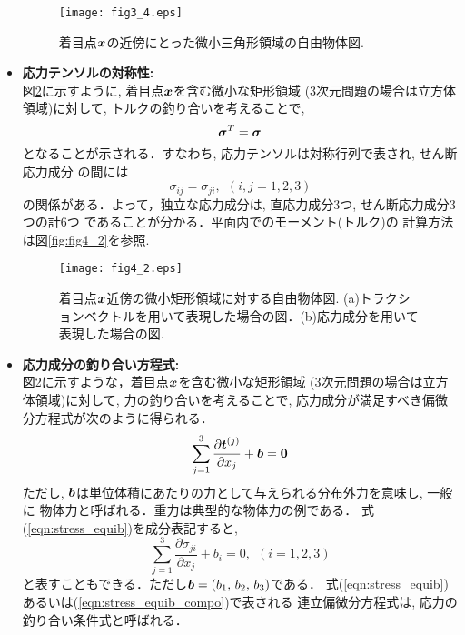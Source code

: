 \documentclass[10pt,a4j]{jbook}
\begin{document}
\begin{itemize}
\begin{figure}[h]
		\begin{center}
		\texttt{[image: fig3\_4.eps]} 
		\end{center}
		\caption{着目点$\mbox{\boldmath $x$}$の近傍にとった微小三角形領域の自由物体図.}
		\label{fig:fig3_4}
									\end{figure}
\item
	{\bf 応力テンソルの対称性:}\\
	図\ref{fig:fig4_1}に示すように, 着目点$\mbox{\boldmath $x$}$を含む微小な矩形領域
	(3次元問題の場合は立方体領域)に対して, トルクの釣り合いを考えることで, 
	\begin{equation}
		\mbox{\boldmath $\sigma$}^{T}=\mbox{\boldmath $\sigma$}
		\label{eqn:sig_sym}
	\end{equation}
	となることが示される．すなわち, 応力テンソルは対称行列で表され, せん断応力成分
	の間には
	\begin{equation}
		\sigma_{ij}=\sigma_{ji}, \ \ (i,j=1,2,3)
		\label{eqn:sig_sym_comp}
	\end{equation}
	の関係がある．よって，独立な応力成分は, 直応力成分3つ, せん断応力成分3つの計6つ
	であることが分かる．平面内でのモーメント(トルク)の
	計算方法は図\ref{fig:fig4_2}を参照.
\begin{figure}[h]
	\begin{center}
	\texttt{[image: fig4\_2.eps]} 
	\end{center}
	\caption{着目点$\mbox{\boldmath $x$}$近傍の微小矩形領域に対する自由物体図.
	(a)トラクションベクトルを用いて表現した場合の図．(b)応力成分を用いて表現した場合の図.} 
	\label{fig:fig4_1}
\end{figure}
\item
	{\bf 応力成分の釣り合い方程式:}\\
	図\ref{fig:fig4_1}に示すような，着目点$\mbox{\boldmath $x$}$を含む微小な矩形領域
	(3次元問題の場合は立方体領域)に対して, 力の釣り合いを考えることで, 
	応力成分が満足すべき偏微分方程式が次のように得られる．
	\begin{equation}
		\sum_{j=1}^3 \frac{\partial \mbox{\boldmath $t$}^{(j)}}{\partial x_j}+\mbox{\boldmath $b$}=\mbox{\boldmath $0$}
		\label{eqn:stress_equib}
	\end{equation}
	ただし, $\mbox{\boldmath $b$}$は単位体積にあたりの力として与えられる分布外力を意味し, 一般に
	物体力と呼ばれる．重力は典型的な物体力の例である．
	式(\ref{eqn:stress_equib})を成分表記すると, 
	\begin{equation}
		\sum_{j=1}^3 \frac{\partial \sigma_{ji}}{\partial x_j}+b_i=0, \ \ (i=1,2,3)
		\label{eqn:stress_equib_compo}
	\end{equation}
	と表すこともできる．ただし$\mbox{\boldmath $b$}=(b_1,\,b_2,\, b_3)$である．
	式(\ref{eqn:stress_equib})あるいは(\ref{eqn:stress_equib_compo})で表される
	連立偏微分方程式は, 応力の釣り合い条件式と呼ばれる．
\end{itemize}
\end{document}
